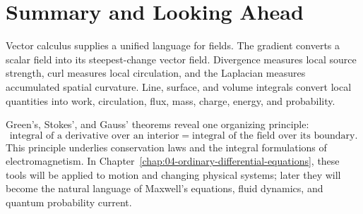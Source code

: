\section{Summary and Looking Ahead}

Vector calculus supplies a unified language for fields. The gradient converts a scalar field into its steepest-change vector field. Divergence measures local source strength, curl measures local circulation, and the Laplacian measures accumulated spatial curvature. Line, surface, and volume integrals convert local quantities into work, circulation, flux, mass, charge, energy, and probability.

Green's, Stokes', and Gauss' theorems reveal one organizing principle:
\[
\boxed{\text{integral of a derivative over an interior}
=\text{integral of the field over its boundary}.}
\]
This principle underlies conservation laws and the integral formulations of electromagnetism. In Chapter~\ref{chap:04-ordinary-differential-equations}, these tools will be applied to motion and changing physical systems; later they will become the natural language of Maxwell's equations, fluid dynamics, and quantum probability current.
